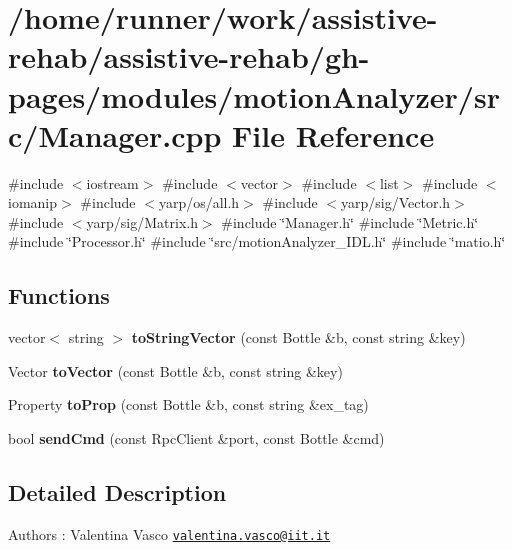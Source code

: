 \section{/home/runner/work/assistive-\/rehab/assistive-\/rehab/gh-\/pages/modules/motion\+Analyzer/src/\+Manager.cpp File Reference}
\label{Manager_8cpp}
{\ttfamily \#include $<$iostream$>$}\newline
{\ttfamily \#include $<$vector$>$}\newline
{\ttfamily \#include $<$list$>$}\newline
{\ttfamily \#include $<$iomanip$>$}\newline
{\ttfamily \#include $<$yarp/os/all.\+h$>$}\newline
{\ttfamily \#include $<$yarp/sig/\+Vector.\+h$>$}\newline
{\ttfamily \#include $<$yarp/sig/\+Matrix.\+h$>$}\newline
{\ttfamily \#include \char`\"{}Manager.\+h\char`\"{}}\newline
{\ttfamily \#include \char`\"{}Metric.\+h\char`\"{}}\newline
{\ttfamily \#include \char`\"{}Processor.\+h\char`\"{}}\newline
{\ttfamily \#include \char`\"{}src/motion\+Analyzer\+\_\+\+I\+D\+L.\+h\char`\"{}}\newline
{\ttfamily \#include \char`\"{}matio.\+h\char`\"{}}\newline
\subsection*{Functions}
\begin{DoxyCompactItemize}
\item 
\mbox{\label{Manager_8cpp_a37a116f86c8c8ec5a3ea684a10a7557a}} 
vector$<$ string $>$ {\bfseries to\+String\+Vector} (const Bottle \&b, const string \&key)
\item 
\mbox{\label{Manager_8cpp_a74fba86048912b4dc076b20e58c70eee}} 
Vector {\bfseries to\+Vector} (const Bottle \&b, const string \&key)
\item 
\mbox{\label{Manager_8cpp_a1b20ad6a3666e5ed6bf7ae011c796c38}} 
Property {\bfseries to\+Prop} (const Bottle \&b, const string \&ex\+\_\+tag)
\item 
\mbox{\label{Manager_8cpp_a356bf8468eccdb3a52aadb19c42145d8}} 
bool {\bfseries send\+Cmd} (const Rpc\+Client \&port, const Bottle \&cmd)
\end{DoxyCompactItemize}


\subsection{Detailed Description}
\begin{DoxyAuthor}{Authors}
\+: Valentina Vasco \href{mailto:valentina.vasco@iit.it}{\tt valentina.\+vasco@iit.\+it} 
\end{DoxyAuthor}
